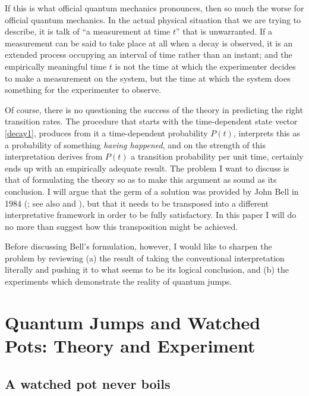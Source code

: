 \documentclass[12pt,a4paper,reqno]{article}
\renewcommand{\(}{\left(}
\renewcommand{\)}{\right)}
\newcommand{\<}{\langle}
\renewcommand{\>}{\rangle}
\theoremstyle{plain} %
\theoremstyle{definition}
\theoremstyle{remark}
\begin{document}
If this is what official quantum mechanics pronounces, then so much the 
worse for official quantum mechanics. In the actual physical situation that 
we are trying to describe, it is talk of ``a measurement at time $t$'' 
that is unwarranted. If a measurement can be said to take place at all 
when a decay is observed, it is an extended process occupying an interval 
of time rather than an instant; and the empirically meaningful time $t$ 
is not the time at which the experimenter decides to make a measurement 
on the system, but the time at which the system does something for the 
experimenter to observe.

Of course, there is no questioning the success of the theory in predicting 
the right transition rates. The procedure that starts with the time-dependent 
state vector \eqref{decay1}, produces from it a time-dependent probability 
$P(t)$, interprets this as a probability of something {\em having happened}, 
and on the strength of this interpretation derives from $P(t)$ a transition 
probability per unit time, certainly ends up with an empirically adequate 
result. The problem I want to discuss is that of formulating the theory 
so as to make this argument as sound as its conclusion. I will argue that
the germ of a solution was provided by John Bell in 1984
(\!\cite{Bell:beables}; see also \cite{QMPN} and \cite{Bub:book}), but
that it needs to be transposed into a different interpretative framework
in order to be fully satisfactory. In this paper I will do no more than suggest
how this transposition might be achieved.

Before discussing Bell's formulation, however, I would like to sharpen 
the problem by reviewing (a) the result of taking the conventional interpretation 
literally and pushing it to what seems to be its logical conclusion, and 
(b) the experiments which demonstrate the reality of quantum jumps.


\section{Quantum Jumps and Watched Pots: Theory and Experiment}

\subsection{A watched pot never boils}
\end{document}
